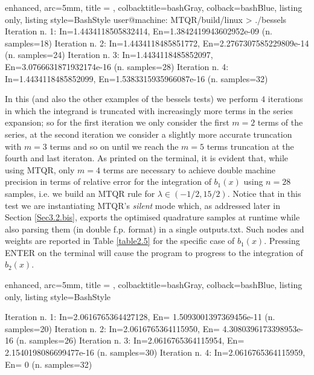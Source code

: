\documentclass[a4paper, twosided]{book}
\begin{document}
\vspace{0.2cm}
\begin{tcblisting}{enhanced,
                   arc=5mm,
                   title = \color{black}{\large \ttfamily Executing the bessels test case: b\_1(x)},
                   colbacktitle=bashGray,
                   colback=bashBlue,
                   listing only,
                   listing style=BashStyle}
user@machine: MTQR/build/linux > ./bessels 
Iteration n. 1:  In=1.4434118505832414, En=1.3842419943602952e-09   (n. samples=18)
Iteration n. 2:  In=1.4434118485851772, En=2.2767307585229809e-14   (n. samples=24)
Iteration n. 3:  In=1.4434118485852097, En=3.0766631871932174e-16   (n. samples=28)
Iteration n. 4:  In=1.4434118485852099, En=1.5383315935966087e-16   (n. samples=32)

\end{tcblisting}
\vspace{0.3cm}

\noindent
In this (and also the other examples of the \colorbox{poliGrayBlue}{bessels} tests) we perform $4$ iterations in which the integrand is truncated with increasingly more terms in the series expansion; so for the first iteration we only consider the first $m=2$ terms of the series, at the second iteration we consider a slightly more accurate truncation with $m=3$ terms and so on until we reach the $m=5$ terms truncation at the fourth and last iteraton. As printed on the terminal, it is evident that, while using MTQR, only $m=4$ terms are necessary to achieve double machine precision in terms of relative error for the integration of $b_1(x)$ using $n=28$ samples, i.e. we build an MTQR rule for $\lambda\in (-1/2, 15/2)$. Notice that in this test we are instantiating MTQR's \textit{silent} mode which, as addressed later in Section \ref{Sec3.2.bis}, exports the optimised quadrature samples at runtime while also parsing them (in double f.p. format) in a single \colorbox{poliGrayBlue}{outputs.txt}. Such nodes and weights are reported in Table \ref{table2.5} for the specific case of $b_1(x)$. Pressing \colorbox{poliGrayBlue}{ENTER} on the terminal will cause the program to progress to the integration of $b_2(x)$. 

\vspace{0.2cm}
\begin{tcblisting}{enhanced,
                   arc=5mm,
                   title = \color{black}{\large \ttfamily Executing the bessels test case: b\_2(x)},
                   colbacktitle=bashGray,
                   colback=bashBlue,
                   listing only,
                   listing style=BashStyle}

Iteration n. 1:  In=2.0616765364427128, En= 1.5093001397369456e-11   (n. samples=20)
Iteration n. 2:  In=2.0616765364115950, En= 4.3080396173398953e-16   (n. samples=26)
Iteration n. 3:  In=2.0616765364115954, En= 2.1540198086699477e-16   (n. samples=30)
Iteration n. 4:  In=2.0616765364115959, En= 0   (n. samples=32)

\end{tcblisting}
\vspace{0.3cm}
\end{document}
